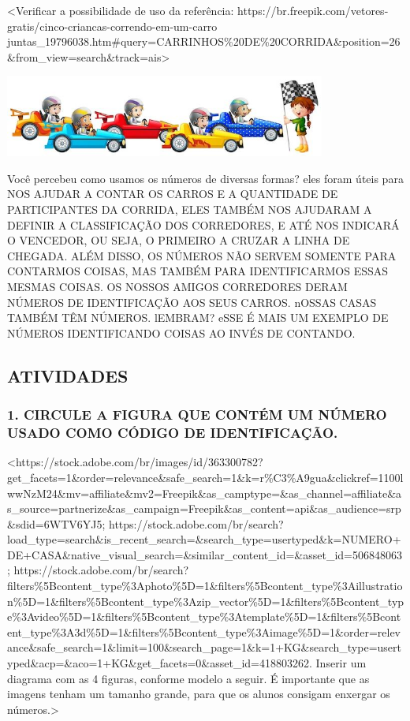 \textless{}Verificar a possibilidade de uso da referência:
https://br.freepik.com/vetores-gratis/cinco-criancas-correndo-em-um-carro
juntas\_19796038.htm\#query=CARRINHOS\%20DE\%20CORRIDA\&position=26\&from\_view=search\&track=ais\textgreater{}

\includegraphics[width=4.15174in,height=1.06137in]{media/image1.jpg}

Você percebeu como usamos os números de diversas formas? eles foram
úteis para NOS AJUDAR A CONTAR OS CARROS E A QUANTIDADE DE PARTICIPANTES
DA CORRIDA, ELES TAMBÉM NOS AJUDARAM A DEFINIR A CLASSIFICAÇÃO DOS
CORREDORES, E ATÉ NOS INDICARÁ O VENCEDOR, OU SEJA, O PRIMEIRO A CRUZAR
A LINHA DE CHEGADA. ALÉM DISSO, OS NÚMEROS NÃO SERVEM SOMENTE PARA
CONTARMOS COISAS, MAS TAMBÉM PARA IDENTIFICARMOS ESSAS MESMAS COISAS. OS
NOSSOS AMIGOS CORREDORES DERAM NÚMEROS DE IDENTIFICAÇÃO AOS SEUS CARROS.
nOSSAS CASAS TAMBÉM TÊM NÚMEROS. lEMBRAM? eSSE É MAIS UM EXEMPLO DE
NÚMEROS IDENTIFICANDO COISAS AO INVÉS DE CONTANDO.

\subsection{ATIVIDADES}\label{atividades}

\subsubsection{1. CIRCULE A FIGURA QUE CONTÉM UM NÚMERO USADO COMO
CÓDIGO DE
IDENTIFICAÇÃO.}\label{circule-a-figura-que-contuxe9m-um-nuxfamero-usado-como-cuxf3digo-de-identificauxe7uxe3o.}

\textless{}https://stock.adobe.com/br/images/id/363300782?get\_facets=1\&order=relevance\&safe\_search=1\&k=r\%C3\%A9gua\&clickref=1100lwwNzM24\&mv=affiliate\&mv2=Freepik\&as\_camptype=\&as\_channel=affiliate\&as\_source=partnerize\&as\_campaign=Freepik\&as\_content=api\&as\_audience=srp\&sdid=6WTV6YJ5;
https://stock.adobe.com/br/search?load\_type=search\&is\_recent\_search=\&search\_type=usertyped\&k=NUMERO+DE+CASA\&native\_visual\_search=\&similar\_content\_id=\&asset\_id=506848063;
https://stock.adobe.com/br/search?filters\%5Bcontent\_type\%3Aphoto\%5D=1\&filters\%5Bcontent\_type\%3Aillustration\%5D=1\&filters\%5Bcontent\_type\%3Azip\_vector\%5D=1\&filters\%5Bcontent\_type\%3Avideo\%5D=1\&filters\%5Bcontent\_type\%3Atemplate\%5D=1\&filters\%5Bcontent\_type\%3A3d\%5D=1\&filters\%5Bcontent\_type\%3Aimage\%5D=1\&order=relevance\&safe\_search=1\&limit=100\&search\_page=1\&k=1+KG\&search\_type=usertyped\&acp=\&aco=1+KG\&get\_facets=0\&asset\_id=418803262.
Inserir um diagrama com as 4 figuras, conforme modelo a seguir. É
importante que as imagens tenham um tamanho grande, para que os alunos
consigam enxergar os números.\textgreater{}


